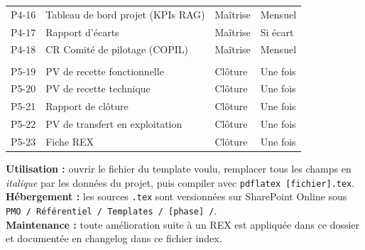 \documentclass[11pt,a4paper,oneside]{report}
\begin{document}
\begin{longtable}{>{\centering\arraybackslash}p{1.5cm} >{\raggedright\arraybackslash}p{5.5cm} >{\raggedright\arraybackslash}p{4cm} >{\raggedright\arraybackslash}p{3.5cm}}
\midrule
\rowcolor{cnIce}
P4-16 & Tableau de bord projet (KPIs RAG) & Maîtrise & Mensuel \\
P4-17 & Rapport d'écarts & Maîtrise & Si écart \\
\rowcolor{cnIce}
P4-18 & CR Comité de pilotage (COPIL) & Maîtrise & Mensuel \\
\midrule
\multicolumn{4}{l}{\cellcolor{cnNavy!15}\textbf{\textcolor{cnNavy}{Phase 5 — Clôture}}} \\
\midrule
P5-19 & PV de recette fonctionnelle & Clôture & Une fois \\
\rowcolor{cnIce}
P5-20 & PV de recette technique & Clôture & Une fois \\
P5-21 & Rapport de clôture & Clôture & Une fois \\
\rowcolor{cnIce}
P5-22 & PV de transfert en exploitation & Clôture & Une fois \\
P5-23 & Fiche REX & Clôture & Une fois \\
\end{longtable}

\begin{reco}
\textbf{Utilisation :} ouvrir le fichier du template voulu, remplacer tous les champs en \textit{italique} par les données du projet, puis compiler avec \texttt{pdflatex [fichier].tex}. \\
\textbf{Hébergement :} les sources \texttt{.tex} sont versionnées sur SharePoint Online sous \texttt{PMO / Référentiel / Templates / [phase] /}. \\
\textbf{Maintenance :} toute amélioration suite à un REX est appliquée dans ce dossier et documentée en changelog dans ce fichier index.
\end{reco}
\end{document}

